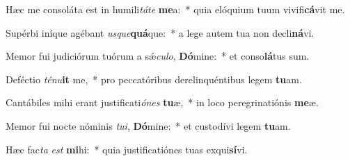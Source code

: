 \item Hæc me consoláta est in humili\textit{tá}\textit{te} \textbf{me}a:~* quia elóquium tuum vivifi\textbf{cá}vit me.
\item Supérbi iníque agébant \textit{us}\textit{que}\textbf{quá}que:~* a lege autem tua non decli\textbf{ná}vi.
\item Memor fui judiciórum tuórum a sǽ\textit{cu}\textit{lo}, \textbf{Dó}mine:~* et conso\textbf{lá}tus sum.
\item Deféctio \textit{té}\textit{nu}\textbf{it} me,~* pro peccatóribus derelinquéntibus legem \textbf{tu}am.
\item Cantábiles mihi erant justificati\textit{ó}\textit{nes} \textbf{tu}æ,~* in loco peregrinatiónis \textbf{me}æ.
\item Memor fui nocte nóminis \textit{tu}\textit{i}, \textbf{Dó}mine:~* et custodívi legem \textbf{tu}am.
\item Hæc fac\textit{ta} \textit{est} \textbf{mi}hi:~* quia justificatiónes tuas exqui\textbf{sí}vi.
